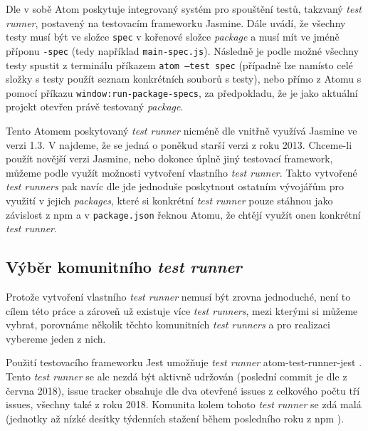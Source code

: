 Dle \cite{atom-docs} v sobě Atom poskytuje integrovaný systém pro spouštění testů, takzvaný \textit{test runner},
postavený na testovacím frameworku Jasmine. Dále \cite{atom-docs} uvádí, že všechny testy musí být ve složce
\texttt{spec} v kořenové složce \textit{package} a musí mít ve jméně příponu \texttt{-spec} (tedy
například \texttt{main-spec.js}). Následně je podle \cite{atom-docs} možné všechny testy spustit z terminálu
příkazem \texttt{atom --test spec} (případně lze namísto celé složky s testy použít seznam
konkrétních souborů s testy), nebo přímo z Atomu s pomocí příkazu \texttt
{window:run-package-specs}, za předpokladu, že je jako aktuální projekt otevřen právě testovaný \textit{package}.

Tento Atomem poskytovaný \textit{test runner} nicméně dle \cite{atom-docs} vnitřně využívá Jasmine ve verzi 1.3. V
\cite{jasmine-releases} najdeme, že se jedná o poněkud starší verzi z roku 2013. Chceme-li použít novější verzi Jasmine,
nebo dokonce úplně jiný testovací framework, můžeme podle \cite{atom-docs} využít možnosti vytvoření vlastního
\textit{test runner}. Takto vytvořené \textit{test runners} pak navíc dle \cite{atom-docs} jde jednoduše poskytnout
ostatním vývojářům pro využití v jejich \textit{packages}, které si konkrétní \textit{test runner} pouze stáhnou jako
závislost z npm a v \texttt{package.json} řeknou Atomu, že chtějí využít onen konkrétní \textit{test runner}.

\subsection{Výběr komunitního \textit{test runner}}

Protože vytvoření vlastního \textit{test runner} nemusí být zrovna jednoduché, není to cílem této práce a zároveň
už existuje více \textit{test runners}, mezi kterými si můžeme vybrat, porovnáme několik těchto komunitních \textit{
test runners} a pro realizaci vybereme jeden z nich.

Použití testovacího frameworku Jest umožňuje \textit{test runner} atom-test-runner-jest \cite{test-runner-jest-github}.
Tento \textit{test runner} se ale nezdá být aktivně udržován (poslední commit je dle \cite{test-runner-jest-github} z
června 2018), issue tracker obsahuje dle \cite{test-runner-jest-github} dva otevřené issues z celkového počtu tří
issues, všechny také z roku 2018. Komunita kolem tohoto \textit{test runner} se zdá malá (jednotky až nízké desítky
týdenních stažení během posledního roku z npm \cite{npm}).

